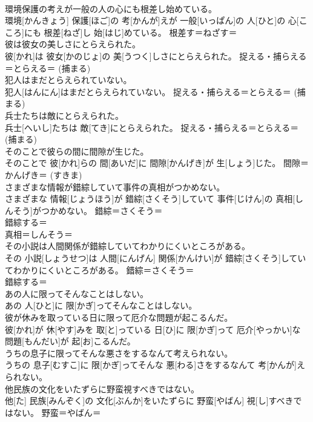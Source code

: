 \documentclass[8pt]{extreport}
\begin{document}
\begin{CJK}{UTF8}{min}
{\\	環境保護の考えが一般の人の心にも根差し始めている。	
\\	環境[かんきょう] 保護[ほご]の 考[かんが]えが 一般[いっぱん]の 人[ひと]の 心[こころ]にも 根差[ねざ]し 始[はじ]めている。	根差す＝ねざす＝ 
\\	彼は彼女の美しさにとらえられた。	
\\	彼[かれ]は 彼女[かのじょ]の 美[うつく]しさにとらえられた。	捉える・捕らえる＝とらえる＝ (捕まる) 
\\	犯人はまだとらえられていない。	
\\	犯人[はんにん]はまだとらえられていない。	捉える・捕らえる＝とらえる＝ (捕まる) 
\\	兵士たちは敵にとらえられた。	
\\	兵士[へいし]たちは 敵[てき]にとらえられた。	捉える・捕らえる＝とらえる＝ (捕まる) 
\\	そのことで彼らの間に間隙が生じた。	
\\	そのことで 彼[かれ]らの 間[あいだ]に 間隙[かんげき]が 生[しょう]じた。	間隙＝かんげき＝ (すきま) 
\\	さまざまな情報が錯綜していて事件の真相がつかめない。	
\\	さまざまな 情報[じょうほう]が 錯綜[さくそう]していて 事件[じけん]の 真相[しんそう]がつかめない。	錯綜＝さくそう＝ 
\\	錯綜する＝ 
\\	真相＝しんそう＝ 
\\	その小説は人間関係が錯綜していてわかりにくいところがある。	
\\	その 小説[しょうせつ]は 人間[にんげん] 関係[かんけい]が 錯綜[さくそう]していてわかりにくいところがある。	錯綜＝さくそう＝ 
\\	錯綜する＝ 
\\	あの人に限ってそんなことはしない。	
\\	あの 人[ひと]に 限[かぎ]ってそんなことはしない。	
\\	彼が休みを取っている日に限って厄介な問題が起こるんだ。	
\\	彼[かれ]が 休[やす]みを 取[と]っている 日[ひ]に 限[かぎ]って 厄介[やっかい]な 問題[もんだい]が 起[お]こるんだ。	
\\	うちの息子に限ってそんな悪さをするなんて考えられない。	
\\	うちの 息子[むすこ]に 限[かぎ]ってそんな 悪[わる]さをするなんて 考[かんが]えられない。	
\\	他民族の文化をいたずらに野蛮視すべきではない。	
\\	他[た] 民族[みんぞく]の 文化[ぶんか]をいたずらに 野蛮[やばん] 視[し]すべきではない。	野蛮＝やばん＝ 
}
\end{CJK}
\end{document}
